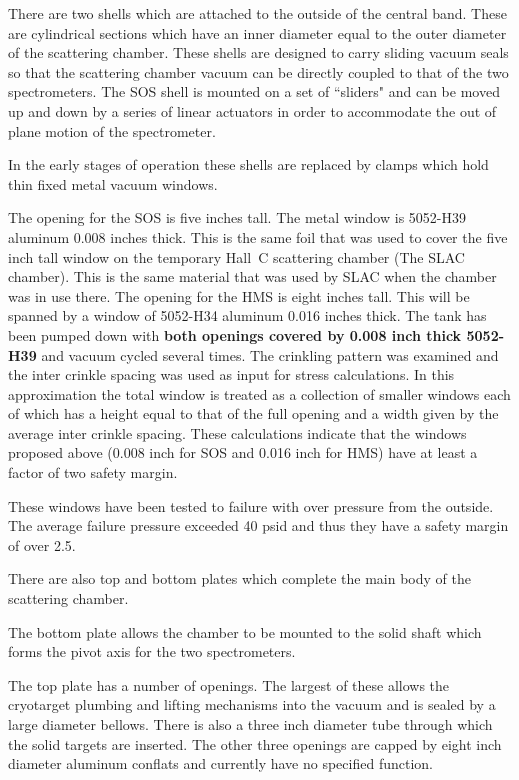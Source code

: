 There are two shells which are attached to the outside of the central
band. These are cylindrical sections which have an inner diameter
equal to the outer diameter of the scattering chamber. These shells
are designed to carry sliding vacuum seals so that the scattering
chamber vacuum can be directly coupled to that of the two spectrometers.
The SOS shell is mounted on a set of ``sliders" and can be moved
up and down by a series of linear actuators in order to accommodate the
out of plane motion of the spectrometer.

In the early stages of operation these shells are replaced by
clamps which hold thin fixed metal vacuum windows.

The opening for the SOS is five inches tall. The metal window is
5052-H39 aluminum 0.008 inches thick. This is the same foil that was used to
cover the five inch tall window on the temporary Hall~C scattering chamber
(The SLAC chamber). This is the same material that was used by SLAC when
the chamber was in use there.
The opening for the HMS
is eight inches tall. This will be spanned by a window of
5052-H34 aluminum 0.016 inches thick. The tank has been pumped down with
{\bf both openings covered by 0.008 inch thick 5052-H39 }
and vacuum cycled several
times. The crinkling pattern was examined and the inter crinkle spacing
was used as input for stress calculations. In this approximation the
total window is treated as a collection of smaller windows each of which
has a height equal to that of the full opening and a width given by the average
inter crinkle spacing. These calculations indicate that the windows
proposed above (0.008 inch for SOS and 0.016 inch for HMS) have at least
a factor of two safety margin.

These windows have been tested to failure with over pressure from the
outside.  The average failure pressure exceeded 40 psid and thus they
have a safety margin of over 2.5.  

There are also top and bottom plates which complete the main body of the
scattering chamber.

The bottom plate allows the chamber to be mounted to the
solid shaft which forms the pivot axis for the two spectrometers.


The top plate has a number of openings. The largest of these allows
the cryotarget plumbing and lifting mechanisms into the vacuum and is sealed by
a large diameter bellows. There is also a three inch diameter tube through
which the solid targets are inserted.
The other three openings are capped by eight inch diameter aluminum
conflats and currently have no specified function.

